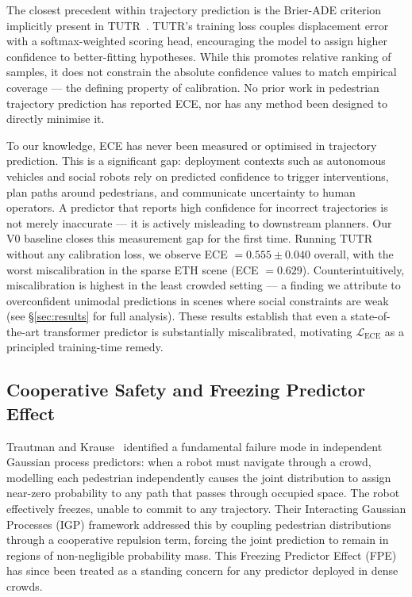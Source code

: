 \documentclass{article}
\begin{document}
The closest precedent within trajectory prediction is the Brier-ADE criterion
implicitly present in TUTR~\cite{shi2023tutr}.
TUTR's training loss couples displacement error with a softmax-weighted scoring
head, encouraging the model to assign higher confidence to better-fitting
hypotheses.
While this promotes relative ranking of samples, it does not constrain the
absolute confidence values to match empirical coverage --- the defining property
of calibration.
No prior work in pedestrian trajectory prediction has reported ECE, nor has
any method been designed to directly minimise it.

To our knowledge, ECE has never been measured or optimised in trajectory
prediction.
This is a significant gap: deployment contexts such as autonomous vehicles and
social robots rely on predicted confidence to trigger interventions, plan paths
around pedestrians, and communicate uncertainty to human operators.
A predictor that reports high confidence for incorrect trajectories is not
merely inaccurate --- it is actively misleading to downstream planners.
Our V0 baseline closes this measurement gap for the first time.
Running TUTR without any calibration loss, we observe
ECE \(= 0.555 \pm 0.040\) overall, with the worst miscalibration in the sparse
ETH scene (ECE \(= 0.629\)).
Counterintuitively, miscalibration is highest in the least crowded setting ---
a finding we attribute to overconfident unimodal predictions in scenes where
social constraints are weak (see \S\ref{sec:results} for full analysis).
These results establish that even a state-of-the-art transformer predictor is
substantially miscalibrated, motivating \(\mathcal{L}_{\text{ECE}}\) as a
principled training-time remedy.

\subsection{Cooperative Safety and Freezing Predictor Effect}

Trautman and Krause~\cite{trautman2010unfreezing} identified a fundamental
failure mode in independent Gaussian process predictors: when a robot must
navigate through a crowd, modelling each pedestrian independently causes the
joint distribution to assign near-zero probability to any path that passes
through occupied space.
The robot effectively freezes, unable to commit to any trajectory.
Their Interacting Gaussian Processes (IGP) framework addressed this by coupling
pedestrian distributions through a cooperative repulsion term, forcing the
joint prediction to remain in regions of non-negligible probability mass.
This Freezing Predictor Effect (FPE) has since been treated as a standing
concern for any predictor deployed in dense crowds.
\end{document}
